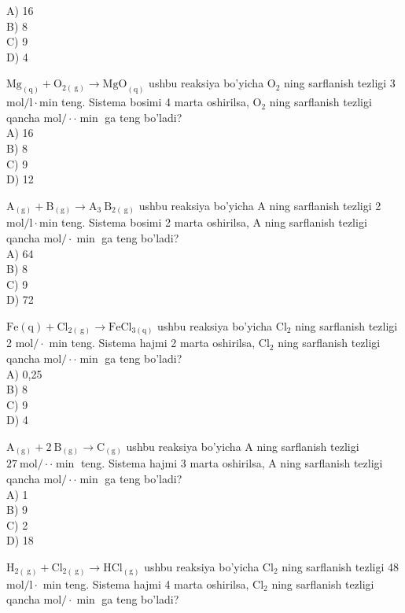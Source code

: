 A) 16\\
B) 8\\
C) 9\\
D) 4
  \item $\mathrm{Mg}_{(\mathrm{q})}+\mathrm{O}_{2(\mathrm{~g})} \rightarrow \mathrm{MgO}_{(\mathrm{q})}$ ushbu reaksiya bo'yicha $\mathrm{O}_{2}$ ning sarflanish tezligi 3 $\mathrm{mol} / \mathrm{l} \cdot \mathrm{min}$ teng. Sistema bosimi 4 marta oshirilsa, $\mathrm{O}_{2}$ ning sarflanish tezligi qancha $\mathrm{mol} / \cdot \cdot \min$ ga teng bo'ladi?\\
A) 16\\
B) 8\\
C) 9\\
D) 12
  \item $\mathrm{A}_{(\mathrm{g})}+\mathrm{B}_{(\mathrm{g})} \rightarrow \mathrm{A}_{3} \mathrm{~B}_{2(\mathrm{~g})}$ ushbu reaksiya bo'yicha A ning sarflanish tezligi 2 $\mathrm{mol} / \mathrm{l} \cdot \mathrm{min}$ teng. Sistema bosimi 2 marta oshirilsa, A ning sarflanish tezligi qancha $\mathrm{mol} / \cdot \min$ ga teng bo'ladi?\\
A) 64\\
B) 8\\
C) 9\\
D) 72
  \item $\mathrm{Fe}(\mathrm{q})+\mathrm{Cl}_{2(\mathrm{~g})} \rightarrow \mathrm{FeCl}_{3(\mathrm{q})}$ ushbu reaksiya bo'yicha $\mathrm{Cl}_{2}$ ning sarflanish tezligi 2 $\mathrm{mol} / \cdot$ min teng. Sistema hajmi 2 marta oshirilsa, $\mathrm{Cl}_{2}$ ning sarflanish tezligi qancha $\mathrm{mol} / \cdot \cdot \min$ ga teng bo'ladi?\\
A) 0,25\\
B) 8\\
C) 9\\
D) 4
  \item $\mathrm{A}_{(\mathrm{g})}+2 \mathrm{~B}_{(\mathrm{g})} \rightarrow \mathrm{C}_{(\mathrm{g})}$ ushbu reaksiya bo'yicha A ning sarflanish tezligi $27 \mathrm{~mol} / \cdot \cdot \min$ teng. Sistema hajmi 3 marta oshirilsa, A ning sarflanish tezligi qancha $\mathrm{mol} / \cdot \cdot \min$ ga teng bo'ladi?\\
A) 1\\
B) 9\\
C) 2\\
D) 18
  \item $\mathrm{H}_{2(\mathrm{~g})}+\mathrm{Cl}_{2(\mathrm{~g})} \rightarrow \mathrm{HCl}_{(\mathrm{g})}$ ushbu reaksiya bo'yicha $\mathrm{Cl}_{2}$ ning sarflanish tezligi 48 $\mathrm{mol} / \mathrm{l} \cdot$ min teng. Sistema hajmi 4 marta oshirilsa, $\mathrm{Cl}_{2}$ ning sarflanish tezligi qancha $\mathrm{mol} / \cdot \min$ ga teng bo'ladi?\\
